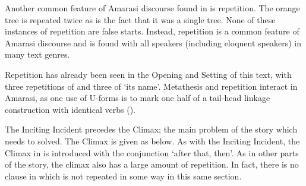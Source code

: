 Another common feature of Amarasi discourse found in 
 is repetition.
The orange tree is repeated twice as is the fact that it was a single tree.
None of these instances of repetition are false starts.
Instead, repetition is a common feature of Amarasi discourse
and is found with all speakers (including eloquent speakers) in many text genres.

Repetition has already been seen in
the Opening 
and Setting  of this text,
with three repetitions of 
and three of  `its name'.
Metathesis and repetition interact in Amarasi,
as one use of U-forms is to mark
one half of a tail-head linkage construction
with identical verbs ().

The Inciting Incident precedes the Climax;
the main problem of the story which needs to solved.
The Climax is given as  below.
As with the Inciting Incident, the Climax in 
is introduced with the conjunction  `after that, then'.
As in other parts of the story, the climax also has a large
amount of repetition. %
In fact, there is no clause in 
which is not repeated in some way in this same section.

